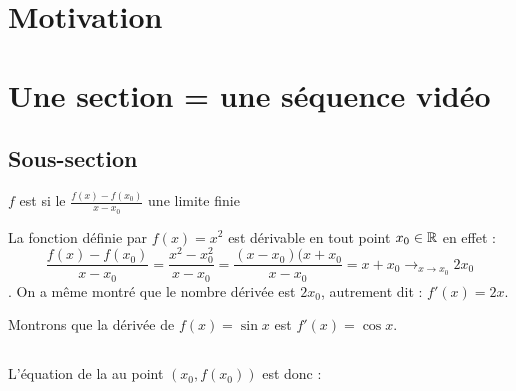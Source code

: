 







\section*{Motivation}


\section{Une section = une séquence vidéo}

\subsection{Sous-section}



\begin{definition}
$f$ est  si le  $\frac{f(x)-f(x_0)}{x-x_0}$ une limite finie
\end{definition}


\begin{exemple}
La fonction définie par $f(x)=x^2$  est dérivable en tout point $x_0 \in \mathbb{R}$ en effet :
$$\frac{f(x)-f(x_0)}{x-x_0} = \frac{x^2-x_0^2}{x-x_0} = \frac{(x-x_0)(x+x_0}{x-x_0}=x+x_0 \longrightarrow_{x \to x_0} 2x_0$$.
On a même montré que le nombre dérivée est $2x_0$, autrement dit : $f'(x)=2x$.
\end{exemple}

\begin{exemple}
Montrons que la dérivée de $f(x)=\sin x$ est $f'(x)=\cos x$.
\end{exemple}



\subsection{}

L'équation de la  au point $(x_0,f(x_0))$ est donc :


